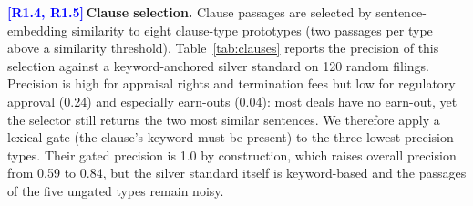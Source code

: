 \documentclass[conference]{IEEEtran}
\newcommand{\rc}[1]{\textcolor{blue}{\textbf{[#1]}}\,}
\newcommand{\rc}[1]{}
\begin{document}
\rc{R1.4, R1.5}\noindent\textbf{Clause selection.}
Clause passages are selected by sentence-embedding similarity to eight clause-type prototypes (two passages per type above a similarity threshold). Table~\ref{tab:clauses} reports the precision of this selection against a keyword-anchored silver standard on 120 random filings. Precision is high for appraisal rights and termination fees but low for regulatory approval (0.24) and especially earn-outs (0.04): most deals have no earn-out, yet the selector still returns the two most similar sentences. We therefore apply a lexical gate (the clause's keyword must be present) to the three lowest-precision types. Their gated precision is 1.0 by construction, which raises overall precision from 0.59 to 0.84, but the silver standard itself is keyword-based and the passages of the five ungated types remain noisy.

\begin{table}[t]
\centering
\caption{Clause-selector passage precision by clause type against a keyword-anchored silver standard (120 random filings, 240 passages per type before gating). Gated types require their keyword after gating, so their precision is 1.0 by construction.}
\label{tab:clauses}
\footnotesize
\setlength{\tabcolsep}{4pt}
\end{table}
\end{document}
